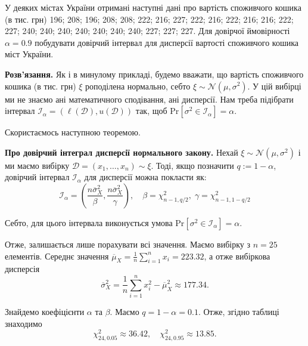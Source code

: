 \documentclass{../hw_template}
\begin{document}
\begin{problems}
    У деяких містах України отримані наступні дані про вартість споживчого
кошика (в тис. грн) 196; 208; 196; 208; 208; 222; 216; 227; 222; 216; 222; 216;
216; 222; 227; 240; 240; 240; 240; 240; 240; 240; 227; 227; 227. Для довірчої
ймовірності $\alpha=0.9$ побудувати довірчий інтервал для дисперсії вартості
споживчого кошика міст України.
\end{problems}

\textbf{Розв'язання.} Як і в минулому прикладі, будемо вважати, що вартість споживчого кошика (в тис. грн) $\xi$ роподілена нормально, себто $\xi \sim \mathcal{N}(\mu,\sigma^2)$. У цій вибірці ми не знаємо ані математичного сподівання, ані дисперсії. Нам треба підібрати інтервал $\mathcal{I}_{\alpha} = (\ell(\mathcal{D}), u(\mathcal{D}))$ так, щоб $\text{Pr}[\sigma^2 \in \mathcal{I}_{\alpha}] = \alpha$. 

Скористаємось наступною теоремою.

\begin{theorem}
    \textbf{Про довірчий інтеграл дисперсії нормального закону.} Нехай $\xi \sim \mathcal{N}(\mu,\sigma^2)$ і ми маємо вибірку $\mathcal{D} = (x_1,\dots,x_n) \sim \xi$. Тоді, якщо позначити $q := 1-\alpha$, довірчий інтервал $\mathcal{I}_{\alpha}$ для дисперсії можна покласти як:
    \begin{equation*}
        \mathcal{I}_{\alpha} = \left(\frac{n\overline{\sigma}_X^2}{\beta}, \frac{n\overline{\sigma}_X^2}{\gamma}\right), \quad \beta = \chi^2_{n-1,q/2}, \; \gamma = \chi^2_{n-1,1-q/2}
    \end{equation*}

    Себто, для цього інтервала виконується умова $\text{Pr}[\sigma^2 \in \mathcal{I}_{\alpha}] = \alpha$.
\end{theorem}

Отже, залишається лише порахувати всі значення. Маємо вибірку з $n = 25$ елементів. Середнє значення $\overline{\mu}_X = \frac{1}{n}\sum_{i=1}^n x_i = 223.32$, а отже вибіркова дисперсія
\begin{equation*}
    \overline{\sigma}_X^2 = \frac{1}{n}\sum_{i=1}^n x_i^2 - \overline{\mu}_X^2 \approx 177.34.
\end{equation*}

Знайдемо коефіцієнти $\alpha$ та $\beta$. Маємо $q=1-\alpha=0.1$. Отже, згідно таблиці знаходимо
\begin{equation*}
    \chi_{24,0.05}^2 \approx 36.42, \quad \chi_{24,0.95}^2 \approx 13.85.
\end{equation*}
\end{document}

